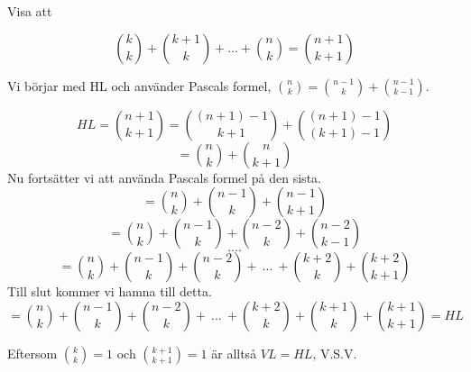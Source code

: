 \documentclass{article}
\begin{document}
\begin{Exercise}

    Visa att

    \[
        \binom{k}{k} + \binom{k+1}{k} + ... + \binom{n}{k} = \binom{n+1}{k+1}
    \]

    Vi börjar med HL och använder Pascals formel, \(\binom{n}{k} = \binom{n-1}{k}+\binom{n-1}{k-1}\).

    \[
        HL = \binom{n+1}{k+1} = \binom{(n+1)-1}{k+1} + \binom{(n+1)-1}{(k+1)-1}
    \]
    \[
        = \binom{n}{k} + \binom{n}{k+1}      
    \]
    Nu fortsätter vi att använda Pascals formel på den sista.
    \[
        = \binom{n}{k} + \binom{n-1}{k} + \binom{n-1}{k+1}
    \]
    \[
        = \binom{n}{k} + \binom{n-1}{k} + \binom{n-2}{k} + \binom{n-2}{k-1}
    \]
    \[....\]
    \[
        = \binom{n}{k} + \binom{n-1}{k} + \binom{n-2}{k} + \ ... \ + \binom{k+2}{k} + \binom{k+2}{k+1} 
    \]
    Till slut kommer vi hamna till detta.
    \[
        = \binom{n}{k} + \binom{n-1}{k} + \binom{n-2}{k} + \ ... \ + \binom{k+2}{k} + \binom{k+1}{k} + \binom{k+1}{k+1} = HL
    \]

    Eftersom \(\binom{k}{k} = 1\) och \(\binom{k+1}{k+1} = 1\) är alltså \(VL = HL\), V.S.V.

\end{Exercise}
\end{document}
